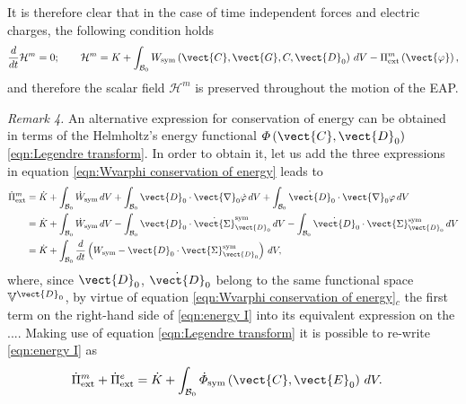 It is therefore clear that in the case of time independent forces and electric charges, the following condition holds
%
\begin{equation}\label{eqn:conservation 1}
\frac{d}{dt}\mathcal{H}^m = 0;\qquad
\mathcal{H}^m =K + \int_{\mathcal{B}_0}W_{\text{sym}}\left(\vect{C},\vect{G},C,\vect{D}_0\right)\,dV - \Pi^m_{\text{ext}}\left(\vect{\varphi}\right),
\end{equation}
%
and therefore the scalar field $\mathcal{H}^m$ is preserved throughout the motion of the EAP.

\noindent\makebox[\linewidth]{\rule{\textwidth}{0.4pt}}

\noindent \textit{Remark 4.} An alternative expression for conservation of energy can be obtained in terms of the Helmholtz's energy functional $\varPhi\left(\vect{C},\vect{D}_0\right)$ \eqref{eqn:Legendre transform}. In order to obtain it, let us add the three expressions in equation \eqref{eqn:Wvarphi conservation of energy} leads to
%
\begin{equation}\label{eqn:energy I}
\begin{aligned}
\dot{\Pi}_{\text{ext}}^m & =
%
\dot{K} + \int_{\mathcal{B}_0}\dot{W}_{\text{sym}}\,dV  +
%
\int_{\mathcal{B}_0}\vect{D}_0\cdot\vect{\nabla}_0\dot{\varphi}\,dV+
%
\int_{\mathcal{B}_0}\dot{\vect{D}}_0\cdot\vect{\nabla}_0\varphi\,dV\\
%
&=\dot{K} + \int_{\mathcal{B}_0}\dot{W}_{\text{sym}}\,dV  -
%
\int_{\mathcal{B}_0}\vect{D}_0\cdot\dot{\vect{\Sigma}}^{\text{sym}}_{\vect{D}_0}\,dV-
%
\int_{\mathcal{B}_0}\dot{\vect{D}}_0\cdot\vect{\Sigma}^{\text{sym}}_{\vect{D}_0}\,dV\\
%
&=\dot{K} + 
%
\int_{\mathcal{B}_0}\frac{d}{dt}\left({W}_{\text{sym}} - \vect{D}_0\cdot{\vect{\Sigma}}^{\text{sym}}_{\vect{D}_0}\right)\,dV,
%
\end{aligned}
\end{equation}
%
where, since $\vect{D}_0$, $\dot{\vect{D}}_0$ belong to the same functional space $\mathbb{V}^{\vect{D}_0}$, by virtue of equation \eqref{eqn:Wvarphi conservation of energy}$_c$ the first term on the right-hand side of \eqref{eqn:energy I} into its equivalent expression on the .... Making use of equation  \eqref{eqn:Legendre transform} it is possible to re-write \eqref{eqn:energy I} as
%
\begin{equation}\label{eqn:energy II}
\begin{aligned}
\dot{\Pi}_{\text{ext}}^m + \dot{\Pi}_{\text{ext}}^e & =
\dot{K} + 
%
\int_{\mathcal{B}_0}\dot{\varPhi}_{\text{sym}}\left(\vect{C},\vect{E}_0\right)\,dV.
%
\end{aligned}
\end{equation}

